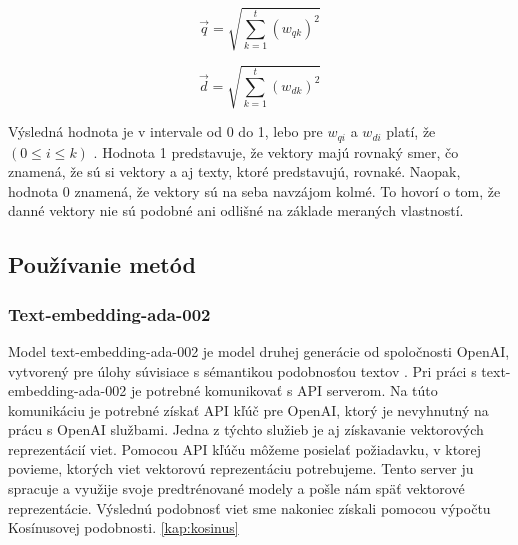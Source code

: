 \begin{equation}
\vec{q} = \sqrt{\sum_{k=1}^{t} (w_{qk})^2}
\end{equation}

\begin{equation}
\vec{d} = \sqrt{\sum_{k=1}^{t} (w_{dk})^2}
\end{equation}
\vspace{1em}

\noindent
Výsledná hodnota  je v intervale od 0 do 1, lebo pre \( {w_{qi}} \) a \( {w_{di}} \) platí, že \((0 \leq i \leq k)\) \cite{cosinus}. Hodnota 1 predstavuje, že vektory majú rovnaký smer, čo znamená, že sú si vektory a aj texty, ktoré predstavujú, rovnaké. Naopak, hodnota 0 znamená, že vektory sú na seba navzájom kolmé. To hovorí o tom, že danné vektory nie sú podobné ani odlišné na základe meraných vlastností. 

\subsection{Používanie metód}
\subsubsection{Text-embedding-ada-002}
Model text-embedding-ada-002 je model druhej generácie od spoločnosti OpenAI, vytvorený pre úlohy súvisiace s sémantikou podobnosťou textov \cite{ada}. Pri práci s text-embedding-ada-002 je potrebné komunikovať s API serverom. Na túto komunikáciu je potrebné získať API kľúč pre OpenAI, ktorý je nevyhnutný na prácu s OpenAI službami. Jedna z týchto služieb je aj získavanie vektorových reprezentácií viet. Pomocou API kľúču môžeme posielať požiadavku, v ktorej povieme, ktorých viet vektorovú reprezentáciu potrebujeme. Tento server ju spracuje a využije svoje predtrénované modely a pošle nám späť vektorové reprezentácie. Výslednú podobnosť viet sme nakoniec získali pomocou výpočtu Kosínusovej podobnosti. \ref{kap:kosinus}

